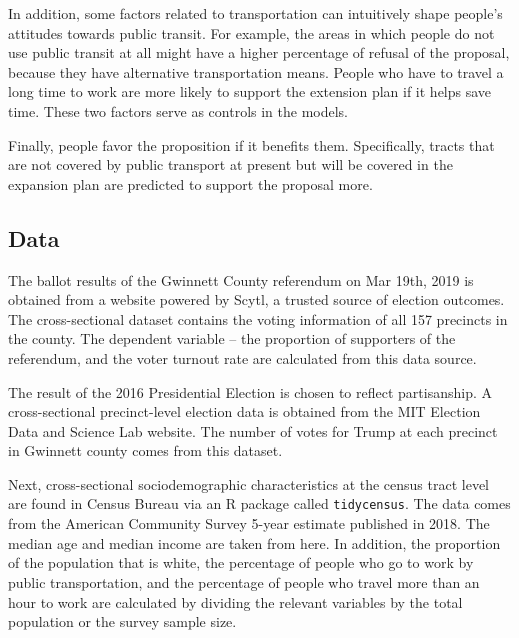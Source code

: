 \documentclass[
]{article}
\begin{document}
In addition, some factors related to transportation can intuitively
shape people's attitudes towards public transit. For example, the areas
in which people do not use public transit at all might have a higher
percentage of refusal of the proposal, because they have alternative
transportation means. People who have to travel a long time to work are
more likely to support the extension plan if it helps save time. These
two factors serve as controls in the models.

Finally, people favor the proposition if it benefits them. Specifically,
tracts that are not covered by public transport at present but will be
covered in the expansion plan are predicted to support the proposal
more.

\hypertarget{data}{%
\subsection{Data}\label{data}}

The ballot results of the Gwinnett County referendum on Mar 19th, 2019
is obtained from a website powered by Scytl, a trusted source of
election outcomes. The cross-sectional dataset contains the voting
information of all 157 precincts in the county. The dependent variable
-- the proportion of supporters of the referendum, and the voter turnout
rate are calculated from this data source.

The result of the 2016 Presidential Election is chosen to reflect
partisanship. A cross-sectional precinct-level election data is obtained
from the MIT Election Data and Science Lab website. The number of votes
for Trump at each precinct in Gwinnett county comes from this dataset.

Next, cross-sectional sociodemographic characteristics at the census
tract level are found in Census Bureau via an R package called
\texttt{tidycensus}. The data comes from the American Community Survey
5-year estimate published in 2018. The median age and median income are
taken from here. In addition, the proportion of the population that is
white, the percentage of people who go to work by public transportation,
and the percentage of people who travel more than an hour to work are
calculated by dividing the relevant variables by the total population or
the survey sample size.
\end{document}

